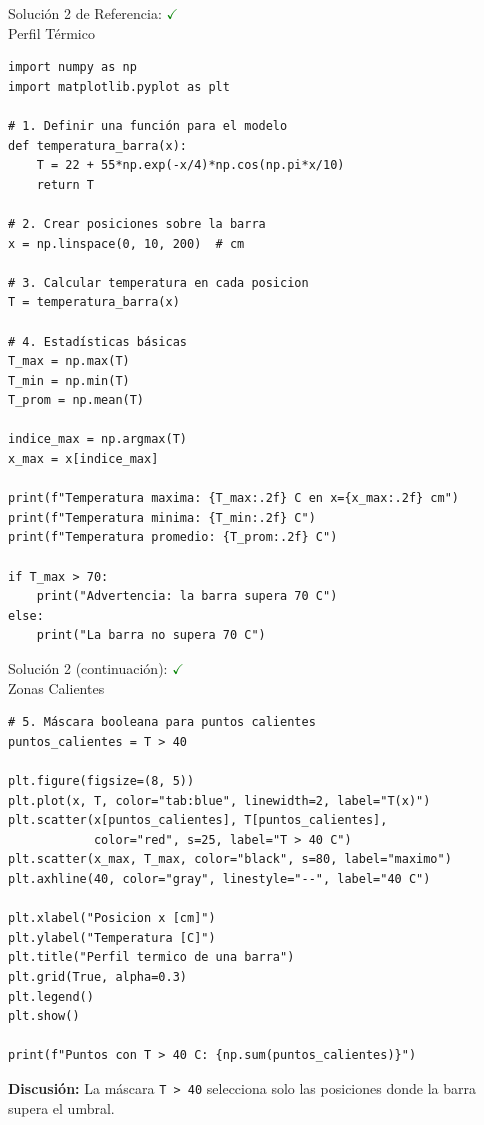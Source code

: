 \documentclass[10pt]{beamer}
\begin{document}
\begin{solutionblock}
\begin{frame}[fragile]{Solución 2 de Referencia: \hfill \textcolor{green}{$\checkmark$} \\ Perfil Térmico}
\begin{Verbatim}[fontsize=\tiny]
import numpy as np
import matplotlib.pyplot as plt

# 1. Definir una función para el modelo
def temperatura_barra(x):
    T = 22 + 55*np.exp(-x/4)*np.cos(np.pi*x/10)
    return T

# 2. Crear posiciones sobre la barra
x = np.linspace(0, 10, 200)  # cm

# 3. Calcular temperatura en cada posicion
T = temperatura_barra(x)

# 4. Estadísticas básicas
T_max = np.max(T)
T_min = np.min(T)
T_prom = np.mean(T)

indice_max = np.argmax(T)
x_max = x[indice_max]

print(f"Temperatura maxima: {T_max:.2f} C en x={x_max:.2f} cm")
print(f"Temperatura minima: {T_min:.2f} C")
print(f"Temperatura promedio: {T_prom:.2f} C")

if T_max > 70:
    print("Advertencia: la barra supera 70 C")
else:
    print("La barra no supera 70 C")
\end{Verbatim}
\end{frame}
\end{solutionblock}

\begin{solutionblock}
\begin{frame}[fragile]{Solución 2 (continuación): \hfill \textcolor{green}{$\checkmark$} \\ Zonas Calientes}
\begin{Verbatim}[fontsize=\tiny]
# 5. Máscara booleana para puntos calientes
puntos_calientes = T > 40

plt.figure(figsize=(8, 5))
plt.plot(x, T, color="tab:blue", linewidth=2, label="T(x)")
plt.scatter(x[puntos_calientes], T[puntos_calientes],
            color="red", s=25, label="T > 40 C")
plt.scatter(x_max, T_max, color="black", s=80, label="maximo")
plt.axhline(40, color="gray", linestyle="--", label="40 C")

plt.xlabel("Posicion x [cm]")
plt.ylabel("Temperatura [C]")
plt.title("Perfil termico de una barra")
plt.grid(True, alpha=0.3)
plt.legend()
plt.show()

print(f"Puntos con T > 40 C: {np.sum(puntos_calientes)}")
\end{Verbatim}
\textbf{Discusión:} La máscara \texttt{T > 40} selecciona solo las posiciones donde la barra supera el umbral.
\end{frame}
\end{solutionblock}
\end{document}
